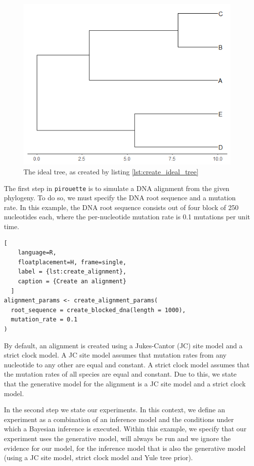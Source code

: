 \documentclass{article}
\begin{document}
\begin{figure}[h]
  \includegraphics[width=\textwidth]{figure_bd.png}
  \caption{The ideal tree, as created by listing \ref{lst:create_ideal_tree}}
\end{figure}

The first step in \verb;pirouette; is to simulate a DNA alignment from the 
given phylogeny. To do so, we must specify the DNA root sequence
and a mutation rate. In this example, the DNA root sequence consists
out of four block of 250 nucleotides each, where the per-nucleotide
mutation rate is 0.1 mutations per unit time.

\begin{lstlisting}[
    language=R,
    floatplacement=H, frame=single,
    label = {lst:create_alignment}, 
    caption = {Create an alignment}
  ]
alignment_params <- create_alignment_params(
  root_sequence = create_blocked_dna(length = 1000),
  mutation_rate = 0.1
)
\end{lstlisting}

By default, an alignment is created using a Jukes-Cantor (JC) site model
and a strict clock model. A JC site model assumes that mutation rates from any nucleotide to any other are equal and constant. A strict clock model assumes that the mutation rates of all species are equal and constant.
Due to this, we state that the generative model for the alignment is
a JC site model and a strict clock model.

In the second step we state our experiments. In this context, we
define an experiment as a combination of an inference model
and the conditions under which a Bayesian inference is executed.
Within this example, we specify that our experiment uses the
generative model, will always be run and we ignore the evidence for our model,
for the inference model that is also the generative model (using a
JC site model, strict clock model and Yule tree prior).
\end{document}
